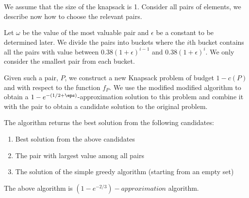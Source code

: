 We assume that the size of the knapsack is 1.
Consider all pairs of elements, we describe now how to choose the relevant pairs.

Let $\omega$ be the value of the most valuable pair and $\epsilon$ be a constant to 
be determined later.
We divide the pairs into buckets where the $i$th bucket contains all the pairs with value
between $0.38 (1 + \epsilon)^{i - 1}$ and $0.38 (1 + \epsilon)^{i}$.
We only consider the smallest pair from each bucket.  

Given such a pair, $P$, we construct a new Knapsack problem of budget $1 - c(P)$ and with 
respect to the function $f_P$.
We use the modified modified algorithm to obtain a $1-e^{-(1/2 + \eps)}$-approximation
solution to this problem and combine it with the pair to obtain a candidate 
solution to the original problem.

The algorithm returns the best solution from the following candidates:
\begin{enumerate}
  \item Best solution from the above candidates
  \item The pair with  largest value among all pairs
  \item The solution of the simple greedy algorithm (starting from an empty set)
\end{enumerate}       

\begin{theorem}
The above algorithm is $(1 - e^{-2/3})-approximation$ algorithm.
\end{theorem}


